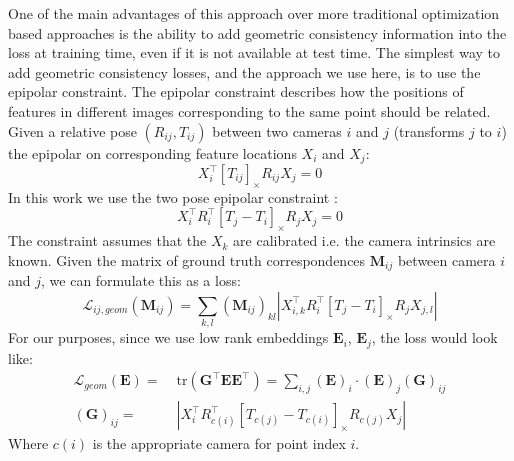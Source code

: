 \documentclass[10pt,twocolumn,letterpaper]{article}
\newcommand{\mat}[1]{\mathbf{#1}}
\newcommand{\cross}[1]{[#1]_{\times}}
\begin{document}
One of the main advantages of this approach over more traditional optimization based approaches is the ability to add geometric consistency information into the loss at training time, even if it is not available at test time.
The simplest way to add geometric consistency losses, and the approach we use here, is to use the epipolar constraint.
The epipolar constraint describes how the positions of features in different images corresponding to the same point should be related.
Given a relative pose $(R_{ij}, T_{ij})$ between two cameras $i$ and $j$  (transforms $j$ to $i$) the epipolar on corresponding feature locations $X_i$ and $X_j$:
\begin{equation}
X_{i}^\top \cross{T_{ij}}R_{ij} X_{j} = 0
\label{eq:essential_constraint_rel}
\end{equation}
In this work we use the two pose epipolar constraint \cite{tron2014quotient}:
\begin{equation}
X_{i}^\top R_{i}^\top \cross{T_{j} - T_{i}}R_{j} X_{j} = 0
\label{eq:essential_constraint}
\end{equation}
The constraint assumes that the $X_k$ are calibrated i.e. the camera intrinsics are known. 
Given the matrix of ground truth correspondences $\mat{M}_{ij}$ between camera $i$ and $j$, we can formulate this as a loss:
\begin{equation}
\mathcal{L}_{ij,geom}(\mat{M}_{ij}) = \sum_{k,l} (\mat{M}_{ij})_{kl} \left|X_{i,k}^\top R_{i}^\top \cross{T_{j} - T_{i}}R_{j} X_{j,l}\right|
\label{eq:geom_cost}
\end{equation}
For our purposes, since we use low rank embeddings $\mat{E}_{i}$, $\mat{E}_{j}$, the loss would look like:
\begin{align}
\mathcal{L}_{geom}(\mat{E})
=&\; \mathrm{tr}(\mat{G}^\top \mat{E}\mat{E}^\top) = \sum_{i,j} (\mat{E})_{i} \cdot (\mat{E})_{j} (\mat{G})_{ij} \\
(\mat{G})_{ij} =&\; \left|X_{i}^\top R_{c(i)}^\top \cross{T_{c(j)} - T_{c(i)}}R_{c(j)} X_{j}\right| \nonumber
\label{eq:geom_cost2}
\end{align}
Where $c(i)$ is the appropriate camera for point index $i$.
\end{document}
